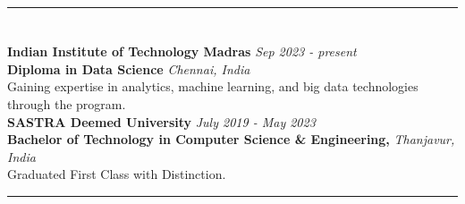 \documentclass[a4paper,10pt]{article}
\begin{document}
\hrule
\vspace{-4mm}
\section{\scshape\color{Fuchsia}{\faGraduationCap\ \textbf EDUCATION}}
\textbf{Indian Institute of Technology Madras} \href{https://drive.google.com/file/d/1HUZf7LIsTZaPjUkf3tKMAnduHmgObdS1/view?usp=sharing}{} \hfill \textit{Sep 2023 - present} \\
\textbf{Diploma in Data Science} \hfill \textit{Chennai, India} \\
Gaining expertise in analytics, machine learning, and big data technologies through the program. \\
\textbf{SASTRA Deemed University} \href{https://drive.google.com/file/d/1phkkQpvXzo3_0dZZnujCL_nOU1YJfxKO/view?usp=sharing}{} \hfill \textit{July 2019 - May 2023} \\
\textbf{Bachelor of Technology in Computer Science \& Engineering,} \hfill \textit{Thanjavur, India} \\
Graduated First Class with Distinction. \\

\hrule
\vspace{-4mm}
\end{document}
